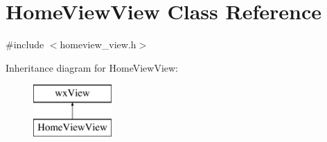 \hypertarget{a00108}{\section{Home\-View\-View Class Reference}
\label{a00108}
}


{\ttfamily \#include $<$homeview\-\_\-view.\-h$>$}

Inheritance diagram for Home\-View\-View\-:\begin{figure}[H]
\begin{center}
\leavevmode
\includegraphics[height=2.000000cm]{a00108}
\end{center}
\end{figure}
